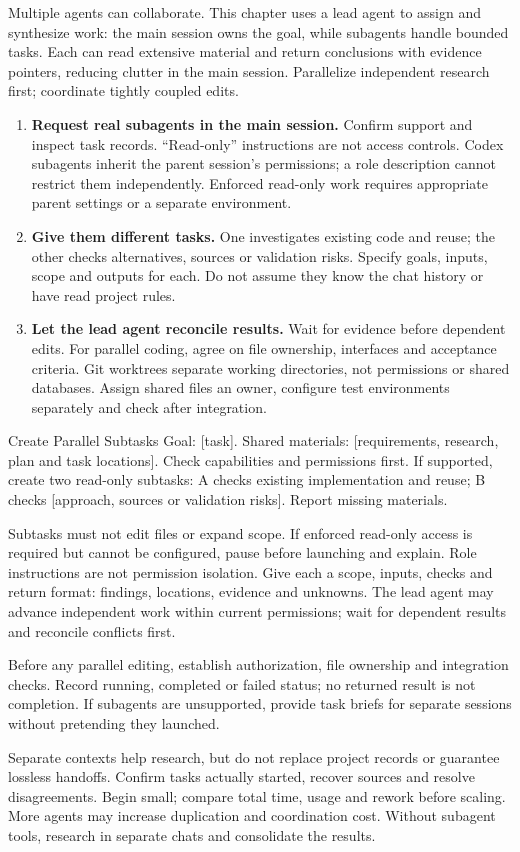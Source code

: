 Multiple agents can collaborate. This chapter uses a lead agent to assign and synthesize work: the main session owns the goal, while subagents handle bounded tasks. Each can read extensive material and return conclusions with evidence pointers, reducing clutter in the main session. Parallelize independent research first; coordinate tightly coupled edits.
\begin{enumerate}
\item \textbf{Request real subagents in the main session.} Confirm support and inspect task records. ``Read-only'' instructions are not access controls. Codex subagents inherit the parent session's permissions; a role description cannot restrict them independently. Enforced read-only work requires appropriate parent settings or a separate environment.
\item \textbf{Give them different tasks.} One investigates existing code and reuse; the other checks alternatives, sources or validation risks. Specify goals, inputs, scope and outputs for each. Do not assume they know the chat history or have read project rules.
\item \textbf{Let the lead agent reconcile results.} Wait for evidence before dependent edits. For parallel coding, agree on file ownership, interfaces and acceptance criteria. Git worktrees separate working directories, not permissions or shared databases. Assign shared files an owner, configure test environments separately and check after integration.
\end{enumerate}
\begin{prompt}{Create Parallel Subtasks}
Goal: [task]. Shared materials: [requirements, research, plan and task locations]. Check capabilities and permissions first. If supported, create two read-only subtasks: A checks existing implementation and reuse; B checks [approach, sources or validation risks]. Report missing materials.\par
Subtasks must not edit files or expand scope. If enforced read-only access is required but cannot be configured, pause before launching and explain. Role instructions are not permission isolation. Give each a scope, inputs, checks and return format: findings, locations, evidence and unknowns. The lead agent may advance independent work within current permissions; wait for dependent results and reconcile conflicts first.\par
Before any parallel editing, establish authorization, file ownership and integration checks. Record running, completed or failed status; no returned result is not completion. If subagents are unsupported, provide task briefs for separate sessions without pretending they launched.
\end{prompt}
Separate contexts help research, but do not replace project records or guarantee lossless handoffs. Confirm tasks actually started, recover sources and resolve disagreements. Begin small; compare total time, usage and rework before scaling. More agents may increase duplication and coordination cost. Without subagent tools, research in separate chats and consolidate the results.
